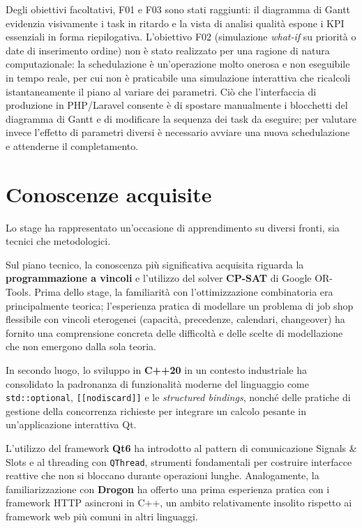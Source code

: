 Degli obiettivi facoltativi, F01 e F03 sono stati raggiunti: il diagramma di Gantt evidenzia visivamente i task in ritardo e la vista di analisi qualità espone i KPI essenziali in forma riepilogativa. L'obiettivo F02 (simulazione \textit{what-if} su priorità o date di inserimento ordine) non è stato realizzato per una ragione di natura computazionale: la schedulazione è un'operazione molto onerosa e non eseguibile in tempo reale, per cui non è praticabile una simulazione interattiva che ricalcoli istantaneamente il piano al variare dei parametri. Ciò che l'interfaccia di produzione in PHP/Laravel consente è di spostare manualmente i blocchetti del diagramma di Gantt e di modificare la sequenza dei task da eseguire; per valutare invece l'effetto di parametri diversi è necessario avviare una nuova schedulazione e attenderne il completamento.

\section{Conoscenze acquisite}
\label{sec:conoscenze}

Lo stage ha rappresentato un'occasione di apprendimento su diversi fronti, sia tecnici che metodologici.

Sul piano tecnico, la conoscenza più significativa acquisita riguarda la \textbf{programmazione a vincoli} e l'utilizzo del solver \textbf{CP-SAT} di Google OR-Tools. Prima dello stage, la familiarità con l'ottimizzazione combinatoria era principalmente teorica; l'esperienza pratica di modellare un problema di job shop flessibile con vincoli eterogenei (capacità, precedenze, calendari, changeover) ha fornito una comprensione concreta delle difficoltà e delle scelte di modellazione che non emergono dalla sola teoria.

In secondo luogo, lo sviluppo in \textbf{C++20} in un contesto industriale ha consolidato la padronanza di funzionalità moderne del linguaggio come \texttt{std::optional}, \texttt{[[nodiscard]]} e le \textit{structured bindings}, nonché delle pratiche di gestione della concorrenza richieste per integrare un calcolo pesante in un'applicazione interattiva Qt.

L'utilizzo del framework \textbf{Qt6} ha introdotto al pattern di comunicazione Signals \& Slots e al threading con \texttt{QThread}, strumenti fondamentali per costruire interfacce reattive che non si bloccano durante operazioni lunghe. Analogamente, la familiarizzazione con \textbf{Drogon} ha offerto una prima esperienza pratica con i framework HTTP asincroni in C++, un ambito relativamente insolito rispetto ai framework web più comuni in altri linguaggi.

